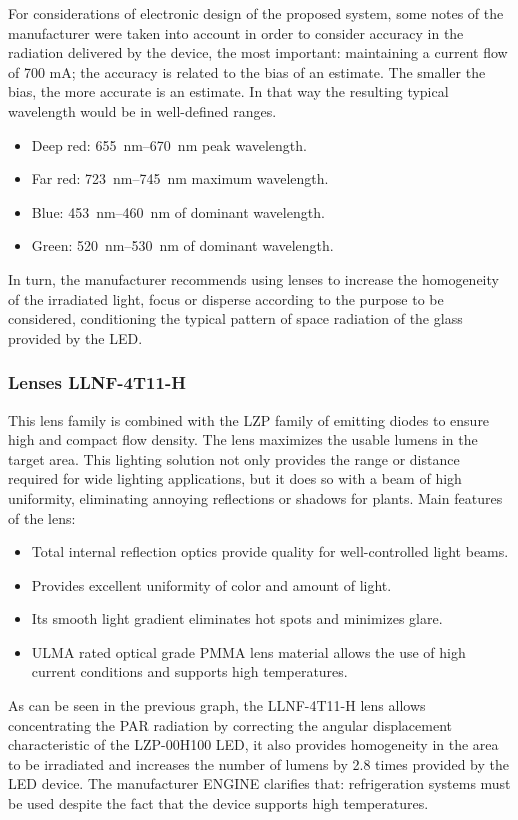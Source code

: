 \documentclass[letterpaper,12pt,twoside]{articleingud}
\begin{document}
For considerations of electronic design of the proposed system, some notes of the manufacturer were taken into account in order to consider accuracy in the radiation delivered by the device, the most important: maintaining a current flow of 700 mA; the accuracy is related to the bias of an estimate. The smaller the bias, the more accurate is an estimate. In that way the resulting typical wavelength would be in well-defined ranges.
\begin{itemize}
    \item Deep red: \SIrange{655}{670}{\nano\metre} peak wavelength.
    \item Far red: \SIrange{723}{745}{\nano\metre} maximum wavelength.
    \item Blue: \SIrange{453}{460}{\nano\metre} of dominant wavelength.
    \item Green: \SIrange{520}{530}{\nano\metre} of dominant wavelength.
\end{itemize}
In turn, the manufacturer recommends using lenses to increase the homogeneity of the irradiated light, focus or disperse according to the purpose to be considered, conditioning the typical pattern of space radiation of the glass provided by the LED.

\subsubsection{Lenses LLNF-4T11-H}
This lens family is combined with the LZP family of emitting diodes to ensure high and compact flow density. The lens maximizes the usable lumens in the target area. This lighting solution not only provides the range or distance required for wide lighting applications, but it does so with a beam of high uniformity, eliminating annoying reflections or shadows for plants. Main features of the lens:
\begin{itemize}
    \item Total internal reflection optics provide quality for well-controlled light beams.
    \item Provides excellent uniformity of color and amount of light.
    \item Its smooth light gradient eliminates hot spots and minimizes glare.
    \item ULMA rated optical grade PMMA lens material allows the use of high current conditions and supports high temperatures.
\end{itemize}
As can be seen in the previous graph, the LLNF-4T11-H lens allows concentrating the PAR radiation by correcting the angular displacement characteristic of the LZP-00H100 LED, it also provides homogeneity in the area to be irradiated and increases the number of lumens by 2.8 times provided by the LED device. The manufacturer ENGINE clarifies that: refrigeration systems must be used despite the fact that the device supports high temperatures.
\end{document}
